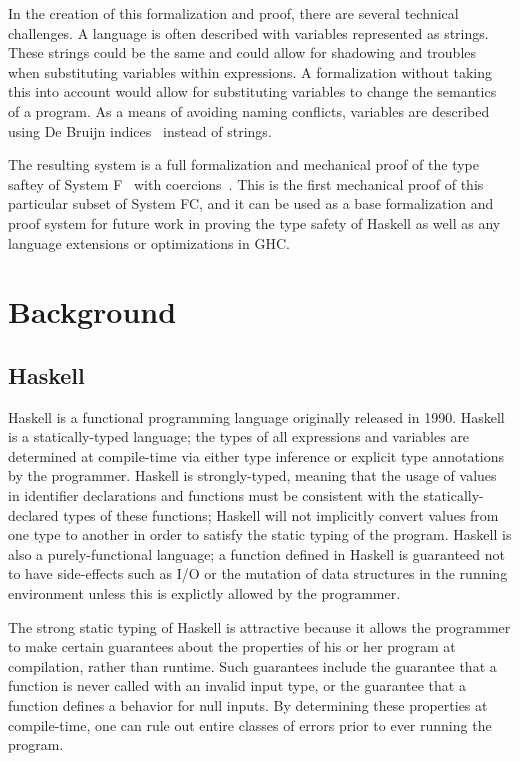 \documentclass{sig-alternate}
\begin{document}
In the creation of this formalization and proof, there are several technical challenges. A language is often described with variables represented as strings. These strings could be the same and could allow for shadowing and troubles when substituting variables within expressions. A formalization without taking this into account would allow for substituting variables to change the semantics of a program. As a means of avoiding naming conflicts, variables are described using De Bruijn indices~\cite{Vouillon12} instead of strings. 

The resulting system is a full formalization and mechanical proof of the type saftey of System F~\cite{Pierce:TAPL} with coercions~\cite{DBLP:conf/rta/VytiniotisJ13}. This is the first mechanical proof of this particular subset of System FC, and it can be used as a base formalization and proof system for future work in proving the type safety of Haskell as well as any language extensions or optimizations in GHC.

\section{Background}
\label{sec:background}

\subsection{Haskell}
\label{sec:background-haskell}

Haskell is a functional programming language originally released in 1990. Haskell is a statically-typed language; the types of all expressions and variables are determined at compile-time via either type inference or explicit type annotations by the programmer. Haskell is strongly-typed, meaning that the usage of values in identifier declarations and functions must be consistent with the statically-declared types of these functions; Haskell will not implicitly convert values from one type to another in order to satisfy the static typing of the program. Haskell is also a purely-functional language; a function defined in Haskell is guaranteed not to have side-effects such as I/O or the mutation of data structures in the running environment unless this is explictly allowed by the programmer. 

The strong static typing of Haskell is attractive because it allows the programmer to make certain guarantees about the properties of his or her program at compilation, rather than runtime. Such guarantees include the guarantee that a function is never called with an invalid input type, or the guarantee that a function defines a behavior for null inputs. By determining these properties at compile-time, one can rule out entire classes of errors prior to ever running the program.
\end{document}
